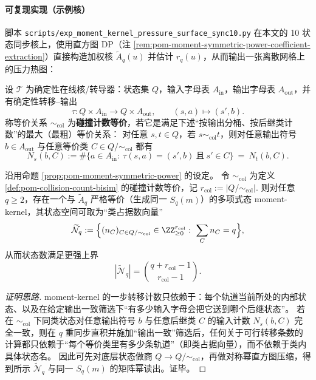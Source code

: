 \paragraph{可复现实现（示例核）}
脚本 \texttt{scripts/exp\_moment\_kernel\_pressure\_surface\_sync10.py} 在本文的 10 状态同步核上，使用直方图 DP（注 \ref{rem:pom-moment-symmetric-power-coefficient-extraction}）直接构造加权核 \(\widetilde A_q(u)\) 并估计 \(r_q(u)\)，从而输出一张离散网格上的压力热图：


\begin{definition}\label{def:pom-collision-count-bisim}
设 \(\mathcal{T}\) 为确定性在线核/转导器：状态集 \(Q\)，输入字母表 \(A_{\mathrm{in}}\)，输出字母表 \(A_{\mathrm{out}}\)，并有确定性转移--输出
\[
\tau:Q\times A_{\mathrm{in}}\to Q\times A_{\mathrm{out}},\qquad (s,a)\mapsto (s',b).
\]
称等价关系 \(\sim_{\mathrm{col}}\) 为\textbf{碰撞计数等价}，若它是满足下述“按输出分桶、按后继类计数”的最大（最粗）等价关系：
对任意 \(s,t\in Q\)，若 \(s\sim_{\mathrm{col}} t\)，则对任意输出符号 \(b\in A_{\mathrm{out}}\) 与任意等价类 \(C\in Q/{\sim_{\mathrm{col}}}\) 都有
\[
N_{s}(b,C):=\#\{a\in A_{\mathrm{in}}:\ \tau(s,a)=(s',b)\ \text{且}\ s'\in C\}
\ =\
N_{t}(b,C).
\]
\end{definition}

\begin{proposition}[对称幂之前的预压缩：用 \texorpdfstring{$r_{\mathrm{col}}=|Q/{\sim_{\mathrm{col}}}|$}{rcol} 替代 \texorpdfstring{$|Q|$}{|Q|}]\label{prop:pom-moment-col-lumping}
沿用命题 \ref{prop:pom-moment-symmetric-power} 的设定。
令 \(\sim_{\mathrm{col}}\) 为定义 \ref{def:pom-collision-count-bisim} 的碰撞计数等价，记
\(
r_{\mathrm{col}}:=|Q/{\sim_{\mathrm{col}}}|.
\)
则对任意 \(q\ge 2\)，存在一个与 \(\widetilde A_q\) 严格等价（生成同一 \(S_q(m)\)）的多项式态 moment-kernel，其状态空间可取为“类占据数向量”
\[
\widetilde{\mathcal{N}}_{q}:=\Bigl\{(n_{C})_{C\in Q/{\sim_{\mathrm{col}}}}\in\ZZ_{\ge 0}^{r_{\mathrm{col}}}:\ \sum_{C}n_{C}=q\Bigr\},
\]
从而状态数满足更强上界
\[
|\widetilde{\mathcal{N}}_q|=\binom{q+r_{\mathrm{col}}-1}{r_{\mathrm{col}}-1}.
\]
\end{proposition}

\begin{proof}[证明思路]
moment-kernel 的一步转移计数只依赖于：每个轨道当前所处的内部状态、以及在给定输出一致筛选下“有多少输入字母会把它送到哪个后继状态”。
若在 \(\sim_{\mathrm{col}}\) 下同类状态对任意输出符号 \(b\) 与任意后继类 \(C\) 的输入计数 \(N_s(b,C)\) 完全一致，则在 \(q\) 重同步直积并施加“输出一致”筛选后，任何关于可行转移条数的计算都只依赖于“每个等价类里有多少条轨道”（即类占据向量），而不依赖于类内具体状态名。
因此可先对底层状态做商 \(Q\to Q/{\sim_{\mathrm{col}}}\)，再做对称幂直方图压缩，得到所示 \(\widetilde{\mathcal{N}}_q\) 与同一 \(S_q(m)\) 的矩阵幂读出。证毕。
\end{proof}

